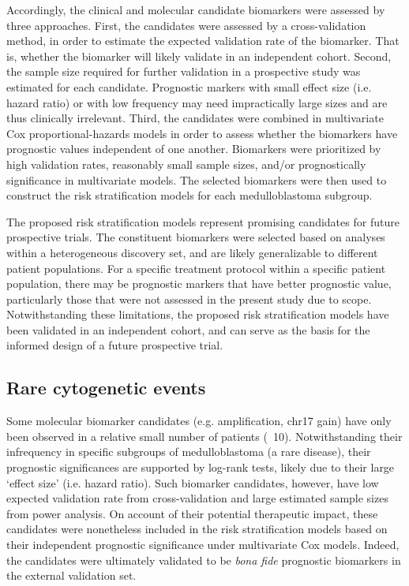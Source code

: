 Accordingly, the clinical and molecular candidate biomarkers were assessed by three approaches. First, the candidates were assessed by a cross-validation method, in order to estimate the expected validation rate of the biomarker. That is, whether the biomarker will likely validate in an independent cohort. Second, the sample size required for further validation in a prospective study was estimated for each candidate. Prognostic markers with small effect size (i.e. hazard ratio) or with low frequency may need impractically large sizes and are thus clinically irrelevant. Third, the candidates were combined in multivariate Cox proportional-hazards models in order to assess whether the biomarkers have prognostic values independent of one another. Biomarkers were prioritized by high validation rates, reasonably small sample sizes, and/or prognostically significance in multivariate models. The selected biomarkers were then used to construct the risk stratification models for each medulloblastoma subgroup.

The proposed risk stratification models represent promising candidates for future prospective trials. The constituent biomarkers were selected based on analyses within a heterogeneous discovery set, and are likely generalizable to different patient populations. For a specific treatment protocol within a specific patient population, there may be prognostic markers that have better prognostic value, particularly those that were not assessed in the present study due to scope. Notwithstanding these limitations, the proposed risk stratification models have been validated in an independent cohort, and can serve as the basis for the informed design of a future prospective trial.

\subsection{Rare cytogenetic events}

Some molecular biomarker candidates (e.g.  amplification, chr17 gain) have only been observed in a relative small number of patients (~10). Notwithstanding their infrequency in specific subgroups of medulloblastoma (a rare disease), their prognostic significances are supported by log-rank tests, likely due to their large `effect size' (i.e. hazard ratio). Such biomarker candidates, however, have low expected validation rate from cross-validation and large estimated sample sizes from power analysis. On account of their potential therapeutic impact, these candidates were nonetheless included in the risk stratification models based on their independent prognostic significance under multivariate Cox models. Indeed, the candidates were ultimately validated to be \emph{bona fide} prognostic biomarkers in the external validation set.

